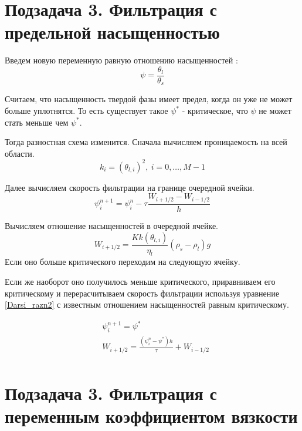\documentclass[12pt]{article}
\begin{document}
\newpage
\section*{Подзадача 3. Фильтрация с предельной насыщенностью}
Введем новую переменную равную отношению насыщенностей : 
$$
\psi = \frac{\theta_l}{\theta_s} 
$$

Считаем, что насыщенность твердой фазы имеет предел, когда он уже не может больше уплотнятся. То есть существует такое $ \psi^* $ - критическое, что $\psi $ не может стать меньше чем $\psi^*$. 

Тогда разностная схема изменится. 
Сначала вычисляем проницаемость на всей области.
\begin{equation}
k_i = (\theta_{l,i})^2 , \ i = 0,  \dots ,M-1
\label{perm_razn2}
\end{equation}

Далее вычисляем скорость фильтрации на границе очередной ячейки.
\begin{equation}
\psi_i^{n+1} = \psi_i^n - \tau\frac{W_{i+1/2} - W_{i-1/2}}{h}
\label{filtr_razn2}
\end{equation}

Вычисляем отношение насыщенностей в очередной ячейке. 
\begin{equation}
W_{i+1/2} = \frac{K k(\theta_{l,i})}{\eta_l}(\rho_s-\rho_l)g
\label{Darsi_razn2}
\end{equation}
Если оно больше критического переходим на следующую ячейку.

Если же наоборот оно получилось меньше критического, приравниваем его критическому и перерасчитываем скорость фильтрации используя уравнение \eqref{Darsi_razn2} с известным отношением насыщенностей равным критическому.

\begin{equation}
\begin{aligned}
&\psi_{i}^{n+1} = \psi^* \\
&W_{i+1/2} = \frac{(\psi_i^n - \psi^*)h}{\tau} + W_{i-1/2} \\
\end{aligned}
\label{corr_razn}
\end{equation}

\newpage
\section*{Подзадача 3. Фильтрация с переменным коэффициентом вязкости}
\end{document}
